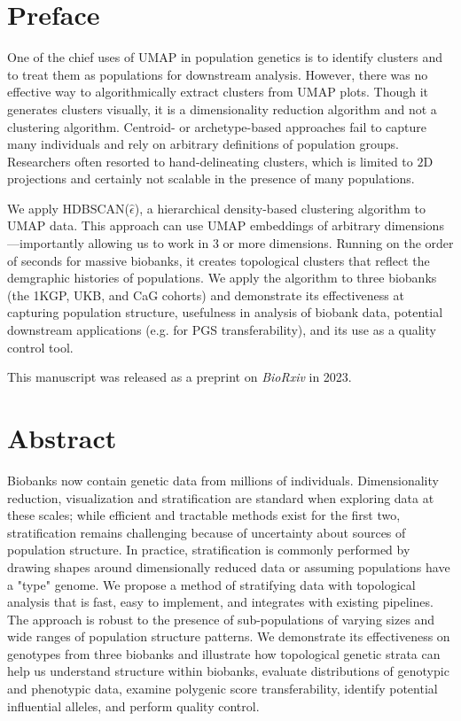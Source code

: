 \setcounter{section}{-1}

\section{Preface}

One of the chief uses of UMAP in population genetics is to identify clusters and to treat them as populations for downstream analysis. However, there was no effective way to algorithmically extract clusters from UMAP plots. Though it generates clusters visually, it is a dimensionality reduction algorithm and not a clustering algorithm. Centroid- or archetype-based approaches fail to capture many individuals and rely on arbitrary definitions of population groups. Researchers often resorted to hand-delineating clusters, which is limited to $2$D projections and certainly not scalable in the presence of many populations.

We apply HDBSCAN($\hat{\epsilon}$), a hierarchical density-based clustering algorithm to UMAP data. This approach can use UMAP embeddings of arbitrary dimensions---importantly allowing us to work in $3$ or more dimensions. Running on the order of seconds for massive biobanks, it creates topological clusters that reflect the demgraphic histories of populations. We apply the algorithm to three biobanks (the 1KGP, UKB, and CaG cohorts) and demonstrate its effectiveness at capturing population structure, usefulness in analysis of biobank data, potential downstream applications (e.g. for PGS transferability), and its use as a quality control tool.

This manuscript was released as a preprint on \textit{BioRxiv} in 2023.

\clearpage

\section{Abstract}

Biobanks now contain genetic data from millions of individuals. Dimensionality reduction, visualization and stratification are standard when exploring data at these scales; while efficient and tractable methods exist for the first two, stratification remains challenging because of uncertainty about sources of population structure. In practice, stratification is commonly performed by drawing shapes around dimensionally reduced data or assuming populations have a "type" genome. We propose a method of stratifying data with topological analysis that is fast, easy to implement, and integrates with existing pipelines. The approach is robust to the presence of sub-populations of varying sizes and wide ranges of population structure patterns. We demonstrate its effectiveness on genotypes from three biobanks and illustrate how topological genetic strata can help us understand structure within biobanks, evaluate distributions of genotypic and phenotypic data, examine polygenic score transferability, identify potential influential alleles, and perform quality control.

